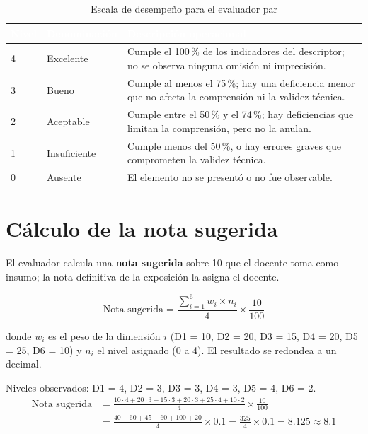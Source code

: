 \documentclass[11pt,a4paper]{article}
\newcommand{\hdr}[1]{\textcolor{white}{\textbf{#1}}}
\begin{document}
{\small
\begin{xltabular}{\linewidth}{@{}C{1.2cm}L{2.8cm}Y@{}}
	\caption{Escala de desempeño para el evaluador par}\label{tab:niveles}\\
	\toprule
	\hdr{Nivel} & \hdr{Denominación} & \hdr{Descripción operacional} \\
	\midrule
	 & Excelente & Cumple el 100\,\% de los indicadores del descriptor; no se observa ninguna omisión ni imprecisión. \\
	3 & Bueno & Cumple al menos el 75\,\%; hay una deficiencia menor que no afecta la comprensión ni la validez técnica. \\
	2 & Aceptable & Cumple entre el 50\,\% y el 74\,\%; hay deficiencias que limitan la comprensión, pero no la anulan. \\
	1 & Insuficiente & Cumple menos del 50\,\%, o hay errores graves que comprometen la validez técnica. \\
	0 & Ausente & El elemento no se presentó o no fue observable. \\
	\bottomrule
\end{xltabular}
}

\section{Cálculo de la nota sugerida}\label{sec:formula}

El evaluador calcula una \textbf{nota sugerida} sobre 10 que el docente toma como insumo; la nota definitiva de la exposición la asigna el docente.

\[
	\text{Nota sugerida} = \frac{\displaystyle\sum_{i=1}^{6} w_i \times n_i}{4} \times \frac{10}{100}
\]

donde $w_i$ es el peso de la dimensión $i$ (D1 = 10, D2 = 20, D3 = 15, D4 = 20, D5 = 25, D6 = 10) y $n_i$ el nivel asignado (0 a 4). El resultado se redondea a un decimal.

\begin{okBox}[title={Ejemplo de cálculo}]
	Niveles observados: D1 = 4, D2 = 3, D3 = 3, D4 = 3, D5 = 4, D6 = 2.
	\begin{align*}
		\text{Nota sugerida} &= \frac{10 \cdot 4 + 20 \cdot 3 + 15 \cdot 3 + 20 \cdot 3 + 25 \cdot 4 + 10 \cdot 2}{4} \times \frac{10}{100}\\
		&= \frac{40 + 60 + 45 + 60 + 100 + 20}{4} \times 0.1 = \frac{325}{4} \times 0.1 = 8.125 \approx 8.1
	\end{align*}
\end{okBox}
\end{document}
